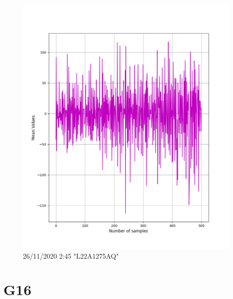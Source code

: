 \documentclass[hidelinks, 12pt, a4paper]{article}
\begin{document}
\begin{figure}[h!]
\centering
	\includegraphics[height=.38\textheight, width=\textwidth]{assets/session1/g15.png}
    \caption{26/11/2020 2:45 "L22A1275AQ"}
\end{figure}

\section{G16}
\end{document}
